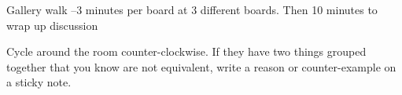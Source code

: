 \begin{applicationActivities}{3}{19}
\begin{activity}{20}
\begin{TBLnote}Gallery walk --3 minutes per board at 3 different boards.  Then 10 minutes to wrap up discussion \end{TBLnote}
Cycle around the room counter-clockwise.  If they have two things grouped together that you know are not equivalent, write a reason or counter-example on a sticky note.
\end{activity}


\end{applicationActivities}

